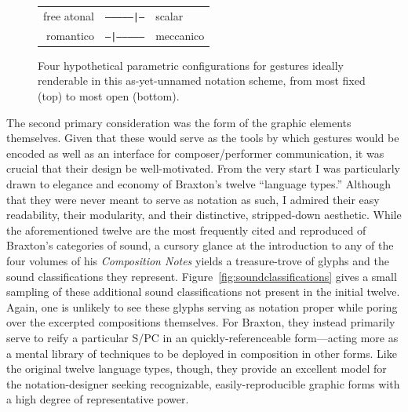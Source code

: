 \begin{figure}
            \vspace{7pt}
        
            \begin{tabular}{|r c l|}
                \hline
                free atonal & \texttt{--------------|--} & scalar \\
                romantico & \texttt{--|--------------} & meccanico \\
                \hline
            \end{tabular}
        
        \captionsetup{width=.5\textwidth}
        \caption{Four hypothetical parametric configurations for gestures ideally renderable in this as-yet-unnamed notation scheme, from most fixed (top) to most open (bottom).}
        \label{fig:sliders}
        \end{figure}

    The second primary consideration was the form of the graphic elements themselves. Given that these would serve as the tools by which gestures would be encoded as well as an interface for composer/performer communication, it was crucial that their design be well-motivated. From the very start I was particularly drawn to elegance and economy of Braxton's twelve ``language types.'' Although that they were never meant to serve as notation as such, I admired their easy readability, their modularity, and their distinctive, stripped-down aesthetic. While the aforementioned twelve are the most frequently cited and reproduced of Braxton's categories of sound, a cursory glance at the introduction to any of the four volumes of his \textit{Composition Notes} yields a treasure-trove of glyphs and the sound classifications they represent. Figure~\ref{fig:soundclassifications} gives a small sampling of these additional sound classifications not present in the initial twelve. Again, one is unlikely to see these glyphs serving as notation proper while poring over the excerpted compositions themselves. For Braxton, they instead primarily serve to reify a particular S/PC in an quickly-referenceable form---acting more as a mental library of techniques to be deployed in composition in other forms. Like the original twelve language types, though, they provide an excellent model for the notation-designer seeking recognizable, easily-reproducible graphic forms with a high degree of representative power.


